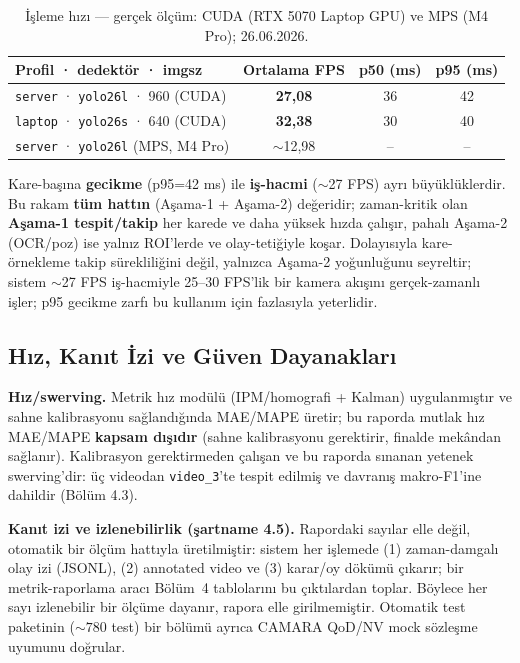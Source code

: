 \documentclass[12pt,a4paper]{article}
\newcommand{\tcode}[1]{\texttt{\small #1}}
\begin{document}
\begin{table}[H]\centering\small
\caption{İşleme hızı — gerçek ölçüm: CUDA (RTX 5070 Laptop GPU) ve MPS (M4 Pro); 26.06.2026.}\label{tab:fps}
\begin{tabularx}{\textwidth}{>{\raggedright\arraybackslash}X ccc}
\toprule
\textbf{Profil · dedektör · imgsz} & \textbf{Ortalama FPS} & \textbf{p50 (ms)} & \textbf{p95 (ms)} \\ \midrule
\tcode{server} · \tcode{yolo26l} · 960 (CUDA) & \textbf{27,08} & 36 & 42 \\
\tcode{laptop} · \tcode{yolo26s} · 640 (CUDA) & \textbf{32,38} & 30 & 40 \\
\tcode{server} · \tcode{yolo26l} (MPS, M4 Pro) & $\sim$12,98 & -- & -- \\
\bottomrule
\end{tabularx}
\end{table}

Kare-başına \textbf{gecikme} (p95=42 ms) ile \textbf{iş-hacmi} (${\sim}$27 FPS) ayrı büyüklüklerdir.
Bu rakam \textbf{tüm hattın} (Aşama-1 + Aşama-2) değeridir; zaman-kritik olan \textbf{Aşama-1 tespit/takip}
her karede ve daha yüksek hızda çalışır, pahalı Aşama-2 (OCR/poz) ise yalnız ROI'lerde ve olay-tetiğiyle
koşar. Dolayısıyla kare-örnekleme takip sürekliliğini değil, yalnızca Aşama-2 yoğunluğunu seyreltir;
sistem ${\sim}$27 FPS iş-hacmiyle 25--30 FPS'lik bir kamera akışını gerçek-zamanlı işler; p95 gecikme
zarfı bu kullanım için fazlasıyla yeterlidir.


\subsection{Hız, Kanıt İzi ve Güven Dayanakları}
\textbf{Hız/swerving.} Metrik hız modülü (IPM/homografi + Kalman) uygulanmıştır ve sahne kalibrasyonu
sağlandığında MAE/MAPE üretir; bu raporda mutlak hız MAE/MAPE \textbf{kapsam dışıdır} (sahne
kalibrasyonu gerektirir, finalde mekândan sağlanır). Kalibrasyon gerektirmeden çalışan ve bu raporda
sınanan yetenek swerving'dir: üç videodan \tcode{video\_3}'te tespit edilmiş ve davranış makro-F1'ine
dahildir (Bölüm 4.3).

\textbf{Kanıt izi ve izlenebilirlik (şartname 4.5).} Rapordaki sayılar elle değil, otomatik bir
ölçüm hattıyla üretilmiştir: sistem her işlemede (1) zaman-damgalı olay izi (JSONL), (2) annotated
video ve (3) karar/oy dökümü çıkarır; bir metrik-raporlama aracı Bölüm~4 tablolarını bu çıktılardan
toplar. Böylece her sayı izlenebilir bir ölçüme dayanır, rapora elle girilmemiştir. Otomatik test
paketinin (${\sim}780$ test) bir bölümü ayrıca CAMARA QoD/NV mock sözleşme uyumunu doğrular.
\end{document}
